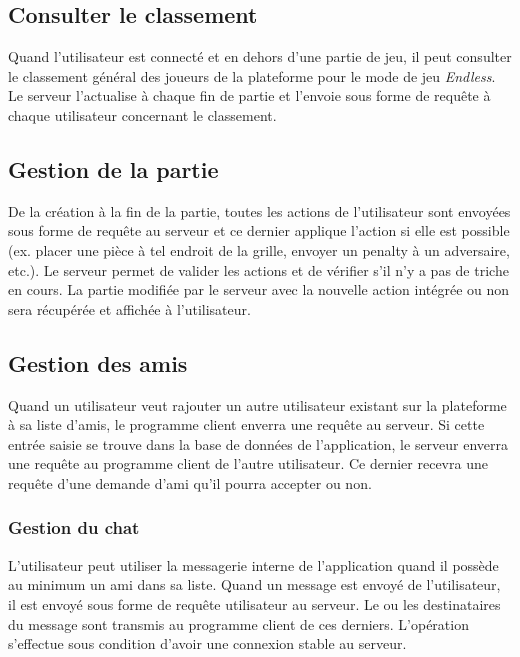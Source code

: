 \documentclass{article}
\begin{document}
\subsection{Consulter le classement}

Quand l'utilisateur est connecté et en dehors d'une partie de jeu, il peut consulter le classement général des joueurs de la plateforme pour le mode de jeu \textit{Endless}. Le serveur l'actualise à chaque fin de partie et l'envoie sous forme de requête à chaque utilisateur concernant le classement.

\subsection{Gestion de la partie}

De la création à la fin de la partie, toutes les actions de l'utilisateur sont envoyées sous forme de requête au serveur et ce dernier applique l'action si elle est possible (ex. placer une pièce à tel endroit de la grille, envoyer un penalty à un adversaire, etc.). Le serveur permet de valider les actions et de vérifier s'il n'y a pas de triche en cours. La partie modifiée par le serveur avec la nouvelle action intégrée ou non sera récupérée et affichée à l'utilisateur.

\subsection{Gestion des amis}

Quand un utilisateur veut rajouter un autre utilisateur existant sur la plateforme à sa liste d'amis, le programme client enverra une requête au serveur. Si cette entrée saisie se trouve dans la base de données de l'application, le serveur enverra une requête au programme client de l'autre utilisateur. Ce dernier recevra une requête d'une demande d'ami qu'il pourra accepter ou non.

\subsubsection{Gestion du chat}

L'utilisateur peut utiliser la messagerie interne de l'application quand il possède au minimum un ami dans sa liste. Quand un message est envoyé de l'utilisateur, il est envoyé sous forme de requête utilisateur au serveur. Le ou les destinataires du message sont transmis au programme client de ces derniers. L'opération s'effectue sous condition d'avoir une connexion stable au serveur.
\end{document}
